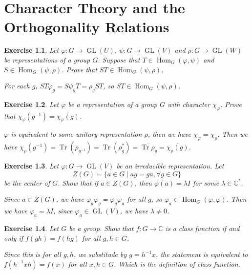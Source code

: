 \documentclass[11pt]{report}
\theoremstyle{mythm}
\let\oldendproof\endproof
\renewenvironment{proof}[1][\proofname]{%
  \oldproof[\normalfont \bfseries #1]%
}{\oldendproof}
\newtheorem{exercise}{Exercise}[chapter]
\renewcommand*{\proofname}{Proof}
\theoremstyle{myans}
\newcommand{\bbC}{\mathbb C}
\DeclareMathOperator{\Hom}{Hom}
\DeclareMathOperator{\Tr}{Tr}
\DeclareMathOperator{\GL}{GL}
\begin{document}
\setcounter{chapter}{3}
\chapter{Character Theory and the Orthogonality Relations}

\begin{exercise}
  Let $\varphi\colon G \to \GL(U)$, $\psi\colon G \to \GL(V )$ and
  $\rho\colon G \to \GL(W )$ be representations of a group $G$. Suppose that
  $T\in \Hom_G(\varphi, \psi)$ and $S\in \Hom_G(\psi, \rho)$.
  Prove that $ST \in \Hom_G(\psi, \rho)$.
  \begin{proof}
    For each $g$, $ST \varphi_g = S \psi_g T = \rho_g ST$, so $ST\in \Hom_G(\psi, \rho)$.
  \end{proof}
\end{exercise}

\begin{exercise}
  Let $\varphi$ be a representation of a group $G$ with character $\chi_\varphi$. Prove that
  $\chi_\varphi(g^{-1}) =\overline{\chi_\varphi(g)}$.
  \begin{proof}
    $\varphi$ is equivalent to some unitary representation $\rho$, then we have $\chi_\varphi = \chi_\rho$.
    Then we have $\chi_\rho(g^{-1}) = \Tr(\rho_{g^{-1}}) = \Tr(\rho_g^*) = \overline{\Tr \rho_g} = \overline{\chi_\rho(g)}$.
  \end{proof}
\end{exercise}

\begin{exercise}
  Let $\varphi\colon G \to \GL(V )$ be an irreducible representation. Let
  \[ Z(G) = \{ a\in G \mid ag = ga, \forall g\in G\} \]
  be the center of $G$. Show that if $a \in Z(G)$, then $\varphi(a) = \lambda I$ for some $\lambda \in \bbC^*$.
  \begin{proof}
    Since $a\in Z(G)$, we have $\varphi_a \varphi_g = \varphi_g \varphi_a$ for all $g$, so
    $\varphi_a\in \Hom_G(\varphi, \varphi)$. Then we have $\varphi_a = \lambda I$, since
    $\varphi_a\in \GL(V)$, we have $\lambda \neq 0$.
  \end{proof}
\end{exercise}

\begin{exercise}
  Let $G$ be a group. Show that $f \colon G \to \bbC$ is a class function if and
  only if $f(gh) = f(hg)$ for all $g, h \in G$.
  \begin{proof}
    Since this is for all $g, h$, we substitude by $g = h^{-1}x$, the statement
    is equivalent to $f(h^{-1}xh) = f(x)$ for all $x, h\in G$. Which is the definition
    of class function.
  \end{proof}
\end{exercise}
\end{document}
